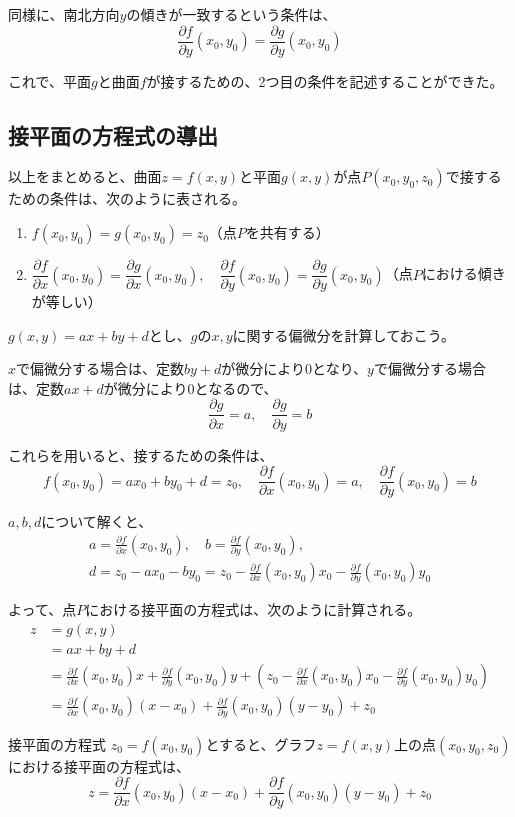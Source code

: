 \documentclass[../../../topic_calculus]{subfiles}
\begin{document}
同様に、南北方向$y$の傾きが一致するという条件は、
\begin{equation*}
  \frac{\partial f}{\partial y}(x_0,y_0) = \frac{\partial g}{\partial y}(x_0,y_0)
\end{equation*}

これで、平面$g$と曲面$f$が接するための、2つ目の条件を記述することができた。

\subsection{接平面の方程式の導出}

以上をまとめると、曲面$z=f(x,y)$と平面$g(x,y)$が点$P(x_0,y_0,z_0)$で接するための条件は、次のように表される。

\begin{enumerate}
  \item $f(x_0,y_0) = g(x_0,y_0) = z_0$（点$P$を共有する）
  \item $\dfrac{\partial f}{\partial x}(x_0,y_0) = \dfrac{\partial g}{\partial x}(x_0,y_0), \quad \dfrac{\partial f}{\partial y}(x_0,y_0) = \dfrac{\partial g}{\partial y}(x_0,y_0)$（点$P$における傾きが等しい）
\end{enumerate}

$g(x,y) = ax+by+d$とし、$g$の$x,y$に関する偏微分を計算しておこう。

$x$で偏微分する場合は、定数$by+d$が微分により$0$となり、$y$で偏微分する場合は、定数$ax+d$が微分により$0$となるので、
\begin{equation*}
  \frac{\partial g}{\partial x} = a, \quad
  \frac{\partial g}{\partial y} = b
\end{equation*}

これらを用いると、接するための条件は、
\begin{equation*}
  f(x_0,y_0) = ax_0 + by_0 + d = z_0, \quad
  \frac{\partial f}{\partial x}(x_0,y_0) = a, \quad
  \frac{\partial f}{\partial y}(x_0,y_0) = b
\end{equation*}

$a,b,d$について解くと、
\begin{gather*}
  a = \frac{\partial f}{\partial x}(x_0,y_0), \quad
  b = \frac{\partial f}{\partial y}(x_0,y_0), \\
  d = z_0 - ax_0 - by_0 = z_0 - \frac{\partial f}{\partial x}(x_0,y_0)x_0 - \frac{\partial f}{\partial y}(x_0,y_0)y_0
\end{gather*}

よって、点$P$における接平面の方程式は、次のように計算される。
\begin{align*}
  z &= g(x,y) \\
    &= ax + by + d \\
    &= \frac{\partial f}{\partial x}(x_0,y_0)x + \frac{\partial f}{\partial y}(x_0,y_0)y + \left( z_0 - \frac{\partial f}{\partial x}(x_0,y_0)x_0 - \frac{\partial f}{\partial y}(x_0,y_0)y_0 \right) \\
    &= \frac{\partial f}{\partial x}(x_0,y_0)(x - x_0) + \frac{\partial f}{\partial y}(x_0,y_0)(y - y_0) + z_0
\end{align*}

\begin{theorem}{接平面の方程式}\label{thm:tangent-plane-equation}
  $z_0 = f(x_0,y_0)$とすると、グラフ$z=f(x,y)$上の点$(x_0,y_0,z_0)$における接平面の方程式は、
  \begin{equation*}
    z = \frac{\partial f}{\partial x}(x_0,y_0)(x - x_0) + \frac{\partial f}{\partial y}(x_0,y_0)(y - y_0) + z_0
  \end{equation*}
\end{theorem}
\end{document}
